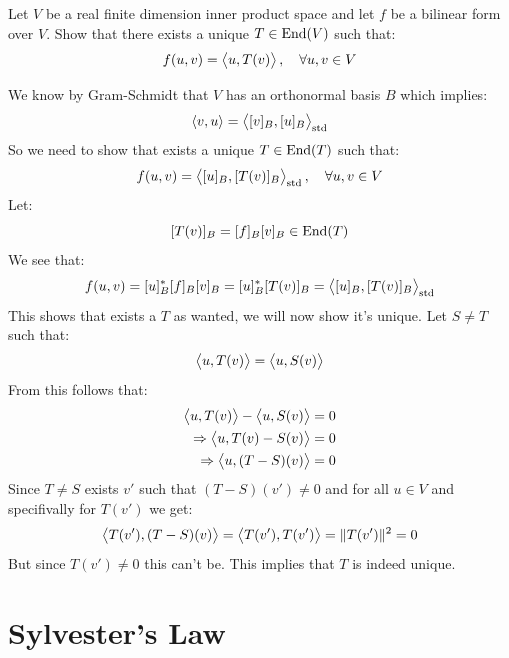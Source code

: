 \documentclass[11pt, a4paper]{article}
\begin{document}
\begin{exercise}
  Let $V$ be a real finite dimension inner product space and let $f$ be a 
  bilinear form over $V$.
  Show that there exists a unique $T\in\operatorname{End}(V)$ such that:
  \[
    f(u,v) = \left\langle u, T(v) \right\rangle, \quad \forall u,v\in V
  \]
\end{exercise}
\begin{solution}
  We know by Gram-Schmidt that $V$ has an orthonormal basis $B$ which 
  implies:
  \[
    \left\langle v, u \right\rangle = \left\langle [v]_B, [u]_B \right\rangle_{\operatorname{std}}
  \]
  So we need to show that exists a unique $T\in\operatorname{End}(T)$ such that:
  \[
    f(u,v) = \left\langle [u]_B, [T(v)]_B \right\rangle_{\operatorname{std}}, \quad \forall u,v\in V
  \]
  Let:
  \[
    [T(v)]_B = [f]_B [v]_B \in \operatorname{End}(T)
  \]
  We see that:
  \[
    f(u,v) = [u]_B^* [f]_B [v]_B = [u]_B^* [T(v)]_B
    = \left\langle [u]_B, [T(v)]_B \right\rangle_{\operatorname{std}}
  \]
  This shows that exists a $T$ as wanted, we will now show it's unique.
  Let $S\neq T$ such that:
  \[
    \left\langle u, T(v) \right\rangle = \left\langle u, S(v) \right\rangle
  \]
  From this follows that:
  \begin{align*}
    \left\langle u, T(v) \right\rangle - \left\langle u, S(v) \right\rangle &= 0 \\ \Rightarrow
    \left\langle u, T(v)-S(v) \right\rangle &= 0 \\ \Rightarrow
    \left\langle u, (T-S)(v) \right\rangle &= 0
  \end{align*}
  Since $T \neq S$ exists $v'$ such that $(T-S)(v')\neq 0$ and for all 
  $u\in V$ and specifivally for $T(v')$ we get:
  \[
    \left\langle T(v'), (T-S)(v) \right\rangle = \left\langle T(v'), T(v') \right\rangle = \|T(v')\|^2 = 0
  \]
  But since $T(v') \neq 0$ this can't be. This implies that $T$ is indeed
  unique.
\end{solution}

\newpage
\section{Sylvester's Law}
\end{document}
